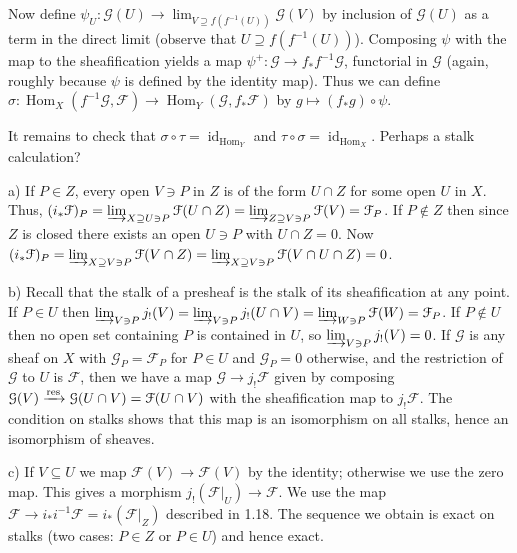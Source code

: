 \documentclass{report}
\newcommand{\F}{\mathcal{F}}
\newcommand{\G}{\mathcal{G}}
\DeclareMathOperator{\Hom}{Hom}
\DeclareMathOperator{\id}{id}
\begin{document}
Now define $\psi_U:\G(U)\rightarrow \lim_{V\supseteq f(f^{-1}(U))}\G(V)$ by inclusion of $\G(U)$ as a term in the direct limit 
(observe that $U\supseteq f(f^{-1}(U))$).  Composing $\psi$ with the map to the sheafification yields a map
$\psi^+:\G\rightarrow f_*f^{-1}\G$, functorial in $\G$ (again, roughly because $\psi$ is defined by the identity map).
Thus we can define $\sigma:\Hom_X(f^{-1}\G,\F)\rightarrow \Hom_Y(\G,f_*\F)$
by $g\mapsto (f_*g)\circ \psi$.  


It remains to check that $\sigma\circ\tau=\id_{\Hom_Y}$ and $\tau\circ\sigma=\id_{\Hom_X}$.
Perhaps a stalk calculation?

\bigskip
{}	a)  If $P\in Z$, every open $V\ni P$ in $Z$ is of the form $U\cap Z$ for some open $U$ in $X$.
Thus, $(i_*\F)_P=\varinjlim_{X\supseteq U\ni P}\F(U\cap Z)=\varinjlim_{Z\supseteq V\ni P}\F(V)=\F_P$.
If $P\not\in Z$ then since $Z$ is closed there exists an open $U\ni P$ with $U\cap Z=0$.
Now	$(i_*\F)_P=\varinjlim_{X\supseteq V\ni P}\F(V\cap Z)=\varinjlim_{X\supseteq V\ni P}\F(V\cap U\cap  Z)=0$.

\noindent
b)	Recall that the stalk of a presheaf is the stalk of its sheafification at any point.  If $P\in U$ then
$\varinjlim_{V\ni P} j_{!}(V)=\varinjlim_{V\ni P} j_{!}(U\cap V)=\varinjlim_{W\ni P}\F(W)=\F_P$.
If $P\not\in U$ then no open set containing $P$ is contained in $U$, so
$\varinjlim_{V\ni P}j_!(V)=0$.	If $\G$ is any sheaf on $X$ with $\G_P=\F_P$ for $P\in U$ and $\G_P=0$ otherwise,
and the restriction of $\G$ to $U$ is $\F$, then we have a map $\G\rightarrow j_{!}\F$ given by
composing $\G(V)\xrightarrow{{\rm res}}\G(U\cap V)=\F(U\cap V)$ with the sheafification map to $j_{!}\F$.
The condition on stalks shows that this map is an isomorphism on all stalks, hence an isomorphism of
sheaves.

\noindent
c)	If $V\subseteq U$ we map $\F(V)\rightarrow \F(V)$ by the identity; otherwise we use the zero map.
This gives a morphism $j_{!}(\F\big|_{U})\rightarrow \F$.  We use the map $\F\rightarrow i_*i^{-1}\F=i_*(\F\big|_{Z})$
described in 1.18.	The sequence we obtain is exact on stalks (two cases: $P\in Z$ or $P\in U$) and hence exact.


\section{}
\end{document}
